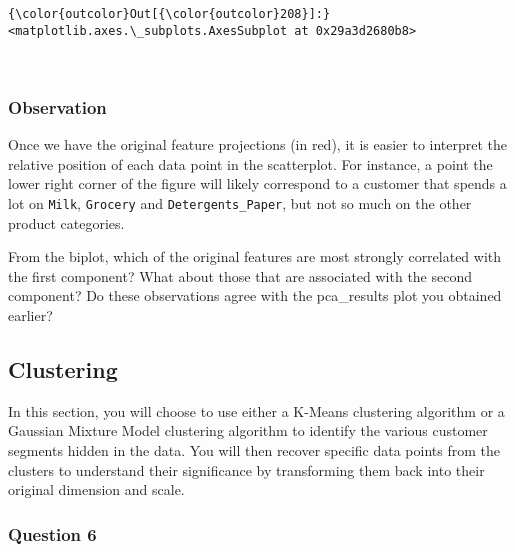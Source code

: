 \documentclass[11pt]{article}
\begin{document}
\begin{Verbatim}[commandchars=\\\{\}]
{\color{outcolor}Out[{\color{outcolor}208}]:} <matplotlib.axes.\_subplots.AxesSubplot at 0x29a3d2680b8>
\end{Verbatim}
            
    \begin{center}
    \end{center}
    { \hspace*{\fill} \\}
    
    \subsubsection{Observation}\label{observation}

Once we have the original feature projections (in red), it is easier to
interpret the relative position of each data point in the scatterplot.
For instance, a point the lower right corner of the figure will likely
correspond to a customer that spends a lot on
\texttt{\textquotesingle{}Milk\textquotesingle{}},
\texttt{\textquotesingle{}Grocery\textquotesingle{}} and
\texttt{\textquotesingle{}Detergents\_Paper\textquotesingle{}}, but not
so much on the other product categories.

From the biplot, which of the original features are most strongly
correlated with the first component? What about those that are
associated with the second component? Do these observations agree with
the pca\_results plot you obtained earlier?

    \subsection{Clustering}\label{clustering}

In this section, you will choose to use either a K-Means clustering
algorithm or a Gaussian Mixture Model clustering algorithm to identify
the various customer segments hidden in the data. You will then recover
specific data points from the clusters to understand their significance
by transforming them back into their original dimension and scale.

    \subsubsection{Question 6}\label{question-6}
\end{document}
